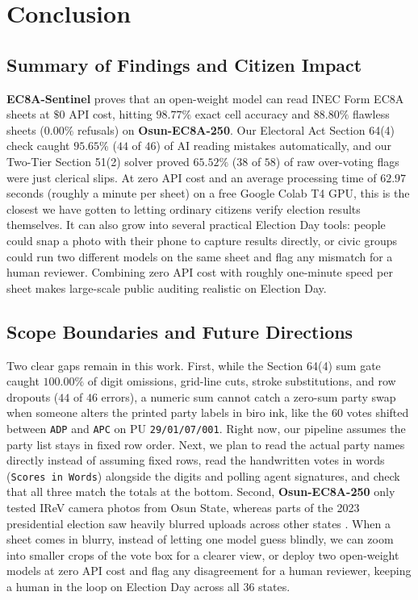 \documentclass{article}
\begin{document}
\section{Conclusion}

\subsection{Summary of Findings and Citizen Impact}

\textbf{EC8A-Sentinel} proves that an open-weight model can read INEC Form EC8A sheets at $\$0$ API cost, hitting $98.77\%$ exact cell accuracy and $88.80\%$ flawless sheets ($0.00\%$ refusals) on \textbf{Osun-EC8A-250}. Our Electoral Act Section 64(4) check caught $95.65\%$ ($44$ of $46$) of AI reading mistakes automatically, and our Two-Tier Section 51(2) solver proved $65.52\%$ ($38$ of $58$) of raw over-voting flags were just clerical slips. At zero API cost and an average processing time of $62.97$ seconds (roughly a minute per sheet) on a free Google Colab T4 GPU, this is the closest we have gotten to letting ordinary citizens verify election results themselves. It can also grow into several practical Election Day tools: people could snap a photo with their phone to capture results directly, or civic groups could run two different models on the same sheet and flag any mismatch for a human reviewer. Combining zero API cost with roughly one-minute speed per sheet makes large-scale public auditing realistic on Election Day.

\subsection{Scope Boundaries and Future Directions}

Two clear gaps remain in this work. First, while the Section 64(4) sum gate caught $100.00\%$ of digit omissions, grid-line cuts, stroke substitutions, and row dropouts ($44$ of $46$ errors), a numeric sum cannot catch a zero-sum party swap when someone alters the printed party labels in biro ink, like the $60$ votes shifted between \texttt{ADP} and \texttt{APC} on PU \texttt{29/01/07/001}. Right now, our pipeline assumes the party list stays in fixed row order. Next, we plan to read the actual party names directly instead of assuming fixed rows, read the handwritten votes in words (\texttt{Scores in Words}) alongside the digits and polling agent signatures, and check that all three match the totals at the bottom. Second, \textbf{Osun-EC8A-250} only tested IReV camera photos from Osun State, whereas parts of the 2023 presidential election saw heavily blurred uploads across other states \cite{veza2024inec}. When a sheet comes in blurry, instead of letting one model guess blindly, we can zoom into smaller crops of the vote box for a clearer view, or deploy two open-weight models at zero API cost and flag any disagreement for a human reviewer, keeping a human in the loop on Election Day across all 36 states.

\clearpage


\end{document}
